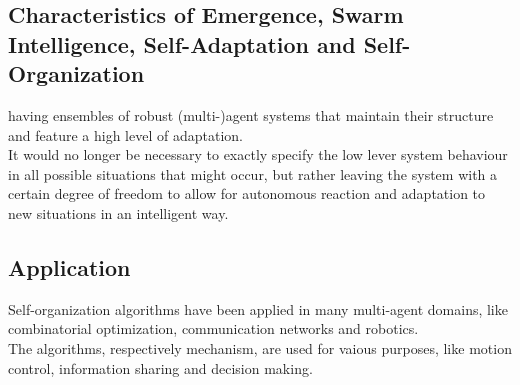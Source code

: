 \subsection{Characteristics of Emergence, Swarm Intelligence, Self-Adaptation and Self-Organization}
having ensembles of robust (multi-)agent systems that maintain their structure and feature a high level of adaptation.\\
It would no longer be necessary to exactly specify the low lever system behaviour in all possible situations that might occur, but rather leaving the system with a certain degree of freedom to allow for autonomous reaction and adaptation to new situations in an intelligent way.

\subsection{Application}
Self-organization algorithms have been applied in many multi-agent domains, like combinatorial optimization, communication networks and robotics.\\
The algorithms, respectively mechanism, are used for vaious purposes, like motion control, information sharing and decision making.
